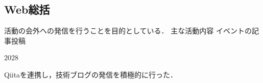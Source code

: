 \subsection*{Web総括}


活動の会外への発信を行うことを目的としている．
主な活動内容
    イベントの記事投稿

2028

Qiitaを連携し，技術ブログの発信を積極的に行った．
